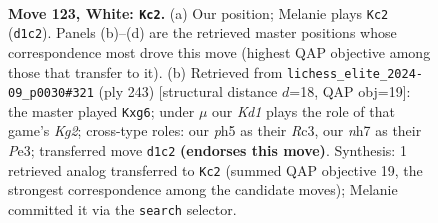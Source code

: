 \documentclass[11pt]{article}
\begin{document}
\begin{figure}[p]\centering
\begin{subfigure}{0.46\textwidth}\centering
\resizebox{\linewidth}{!}{%
\newchessgame
\chessboard[
  setfen={1R6/3r3n/8/4p2p/7b/8/3p2k1/3K4 w - - 10 123},
  showmover=false,
  pgfstyle=straightmove, color=movearrow, markmove={d1-c2}
]}
\caption{}
\end{subfigure}\hfill
\begin{subfigure}{0.46\textwidth}\centering
\resizebox{\linewidth}{!}{%
\newchessgame
\chessboard[
  setfen={1R6/6k1/6P1/3B4/8/2r1p2P/8/3R2K1 b - - 0 122},
  showmover=false,
  pgfstyle=straightmove, color=movearrow, markmove={g7-g6}
]}
\caption{}
\end{subfigure}
\\[4pt]

\caption{\textbf{Move 123, White: \texttt{Kc2}.} (a) Our position; Melanie plays \texttt{Kc2} (\texttt{d1c2}). Panels (b)--(d) are the retrieved master positions whose correspondence most drove this move (highest QAP objective among those that transfer to it). (b) Retrieved from \texttt{lichess\_elite\_2024-09\_p0030\#321} (ply 243) [structural distance $d$=18, QAP obj=19]: the master played \texttt{Kxg6}; under $\mu$ our \emph{Kd1} plays the role of that game's \emph{Kg2}; cross-type roles: our \emph{p}h5 as their \emph{R}c3, our \emph{n}h7 as their \emph{P}e3; transferred move \texttt{d1c2} \textbf{(endorses this move)}. Synthesis: 1 retrieved analog transferred to \texttt{Kc2} (summed QAP objective 19, the strongest correspondence among the candidate moves); Melanie committed it via the \texttt{search} selector.}
\label{fig:thought-m244}
\end{figure}

\clearpage
\end{document}
